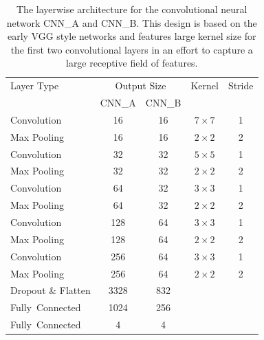  \begin{table}[]
  \centering
  \begin{tabularx}{\textwidth}{Xcccc}
  \toprule
Layer Type & \multicolumn{2}{c}{Output Size} & Kernel & Stride\\ 
                          & CNN\_A & CNN\_B &           &     \\\midrule
Convolution               & 16     & 16   & $7\times7$  & 1   \\ 
Max Pooling               & 16     & 16   & $2\times2$  & 2   \\ 
Convolution               & 32     & 32   & $5\times5$  & 1   \\ 
Max Pooling               & 32     & 32   & $2\times2$  & 2   \\ 
Convolution               & 64     & 32   & $3\times3$  & 1   \\ 
Max Pooling               & 64     & 32   & $2\times2$  & 2   \\ 
Convolution               & 128    & 64   & $3\times3$  & 1   \\ 
Max Pooling               & 128    & 64   & $2\times2$  & 2   \\ 
Convolution               & 256    & 64   & $3\times3$  & 1   \\ 
Max Pooling               & 256    & 64   & $2\times2$  & 2   \\ 
Dropout \& Flatten        & 3328   & 832  &             &     \\ 
\mbox{Fully Connected}    & 1024   & 256  &             &     \\ 
\mbox{Fully Connected}    & 4      & 4    &             &     \\ 
  \bottomrule
  \end{tabularx}
  \caption{The layerwise architecture for the convolutional neural network CNN\_A and CNN\_B. This design is based on the early VGG style networks and features large kernel size for the first two convolutional layers in an effort to capture a large receptive field of features.}
  \label{tab:layers_CNN_A}
  \end{table}


